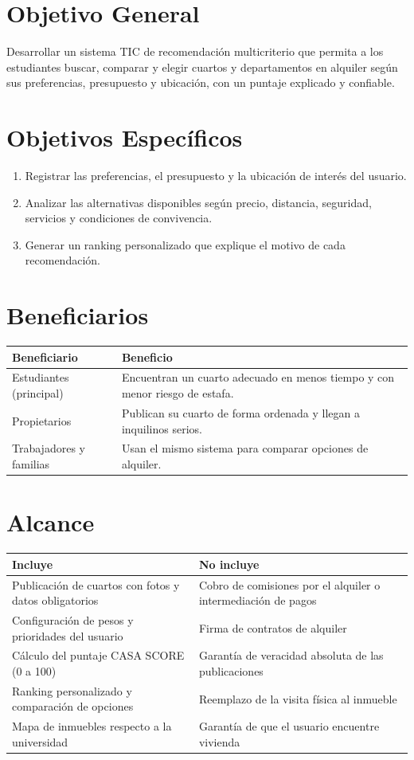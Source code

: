 \documentclass[11pt,a4paper]{article}
\begin{document}
\section{Objetivo General}
Desarrollar un sistema TIC de recomendación multicriterio que permita a los estudiantes buscar, comparar y elegir cuartos y departamentos en alquiler según sus preferencias, presupuesto y ubicación, con un puntaje explicado y confiable.

\section{Objetivos Específicos}
\begin{enumerate}[leftmargin=*]
    \item Registrar las preferencias, el presupuesto y la ubicación de interés del usuario.
    \item Analizar las alternativas disponibles según precio, distancia, seguridad, servicios y condiciones de convivencia.
    \item Generar un ranking personalizado que explique el motivo de cada recomendación.
\end{enumerate}

\section{Beneficiarios}
{\small
\noindent\begin{tabularx}{\textwidth}{@{}P{4.2cm} L@{}}
\toprule
{}
\textbf{Beneficiario} & \textbf{Beneficio} \\
\midrule
Estudiantes (principal) & Encuentran un cuarto adecuado en menos tiempo y con menor riesgo de estafa. \\
Propietarios & Publican su cuarto de forma ordenada y llegan a inquilinos serios. \\
Trabajadores y familias & Usan el mismo sistema para comparar opciones de alquiler. \\
\bottomrule
\end{tabularx}
}

\section{Alcance}
{\small
\noindent\begin{tabularx}{\textwidth}{@{}L L@{}}
\toprule
{}
\textbf{Incluye} & \textbf{No incluye} \\
\midrule
Publicación de cuartos con fotos y datos obligatorios & Cobro de comisiones por el alquiler o intermediación de pagos \\
Configuración de pesos y prioridades del usuario & Firma de contratos de alquiler \\
Cálculo del puntaje CASA SCORE (0 a 100) & Garantía de veracidad absoluta de las publicaciones \\
Ranking personalizado y comparación de opciones & Reemplazo de la visita física al inmueble \\
Mapa de inmuebles respecto a la universidad & Garantía de que el usuario encuentre vivienda \\
\bottomrule
\end{tabularx}
}
\end{document}
